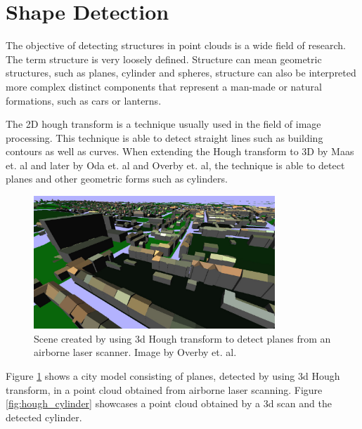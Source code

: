 \section {Shape Detection}

The objective of detecting structures in point clouds is a wide field of research. The term structure is very loosely defined. Structure can mean geometric structures, such as planes, cylinder and spheres, structure can also be interpreted more complex distinct components that represent a man-made or natural formations, such as cars or lanterns. 

The 2D hough transform\cite{hough1962method} is a technique usually used in the field of image processing. This technique is able to detect straight lines such as building contours as well as curves. When extending the Hough transform to 3D by Maas et. al\cite{maas1999two} and later by Oda et. al\cite{oda2004automatic} and Overby et. al\cite{overby2004automatic}, the technique is able to detect planes and other geometric forms such as cylinders\cite{rabbani2005efficient}. 

\begin{figure}
    \centering
    \includegraphics[width=0.81\textwidth]{Related_Work/hough_planes.png}%
    \caption{Scene created by using 3d Hough transform to detect planes from an airborne laser scanner. Image by Overby et. al\cite{overby2004automatic}.}
    \label{fig:hough_planes}
\end{figure}

Figure \ref{fig:hough_planes} shows a city model consisting of planes, detected by using 3d Hough transform, in a point cloud obtained from airborne laser scanning. Figure \ref{fig:hough_cylinder} showcases a point cloud obtained by a 3d scan and the detected cylinder. 

